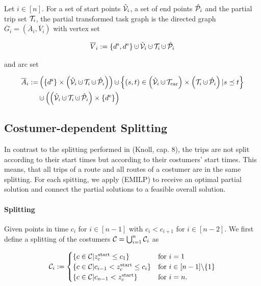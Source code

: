 \begin{definition}

Let $i\in[n]$. For a set of start points $\hat{\mathcal{V}}_i$, a set of end points $\hat{\mathcal{P}}_i$ and the partial trip set $\mathcal{T}_i$, the partial transformed task graph is the directed graph $\overline{G}_i=\left(\overline{A}_i,\overline{V}_i\right)$ with vertex set

\begin{align*}
	\overline{V}_i := \left\{\ds,\de\right\}\cupdot\Vhat_i\cupdot\Ti\cupdot\Phat_i
\end{align*}

and arc set

\begin{align*}
	\overline{A}_i := & \left(\left\{\ds\right\}\times\left(\Vhat_i\cupdot\Ti\cupdot\Phat_i\right)\right)\cupdot\left\{(s,t)\in\left(\Vhat_i\cupdot\Tcar\right)\times\left(\Ti\cupdot\Phat_i\right)|s\preceq t\right\} \\
	& \cupdot\left(\left(\Vhat_i\cupdot\Ti\cupdot\Phat_i\right)\times\left\{\de\right\}\right)
\end{align*}

\end{definition}


\subsection{Costumer-dependent Splitting}

In contrast to the splitting performed in (Knoll, cap. 8), the trips are not split according to their start times but according to their costumers' start times. This means, that all trips of a route and all routes of a costumer are in the same splitting. For each spitting, we apply (EMILP) to receive an optimal partial solution and connect the partial solutions to a feasible overall solution.

\paragraph{Splitting} \parfill

Given points in time $c_i$ for $i\in[n-1]$ with $c_i<c_{i+1}$ for $i\in[n-2]$. We first define a splitting of the costumers $\mathcal{C}=\bigcup_{i=1}^n\mathcal{C}_i$ as

\begin{align*}
	\mathcal{C}_i := \begin{cases}
		\left\{c\in\mathcal{C}|z^{\operatorname{start}}_c\leq c_1\right\} & \text{for } i=1 \\
		\left\{c\in\mathcal{C}|c_{i-1}<z^{\operatorname{start}}_c\leq c_i\right\} & \text{for } i\in[n-1]\backslash\{1\} \\
		\left\{c\in\mathcal{C}|c_{n-1}<z^{\operatorname{start}}_c\right\} & \text{for } i=n.
	\end{cases}
\end{align*}

